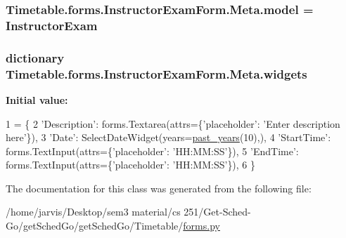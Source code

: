 \subsubsection[{\texorpdfstring{model}{model}}]{\setlength{\rightskip}{0pt plus 5cm}Timetable.\+forms.\+Instructor\+Exam\+Form.\+Meta.\+model = {\bf Instructor\+Exam}\hspace{0.3cm}{\ttfamily [static]}}\hypertarget{classTimetable_1_1forms_1_1InstructorExamForm_1_1Meta_a34a1ffa63c45106f0bd42087cdd17b5c}{}\label{classTimetable_1_1forms_1_1InstructorExamForm_1_1Meta_a34a1ffa63c45106f0bd42087cdd17b5c}
\subsubsection[{\texorpdfstring{widgets}{widgets}}]{\setlength{\rightskip}{0pt plus 5cm}dictionary Timetable.\+forms.\+Instructor\+Exam\+Form.\+Meta.\+widgets\hspace{0.3cm}{\ttfamily [static]}}\hypertarget{classTimetable_1_1forms_1_1InstructorExamForm_1_1Meta_a465e32885f71d0c5718e8d2d9836af9b}{}\label{classTimetable_1_1forms_1_1InstructorExamForm_1_1Meta_a465e32885f71d0c5718e8d2d9836af9b}
{\bfseries Initial value\+:}
\begin{DoxyCode}
1 = \{
2             \textcolor{stringliteral}{'Description'}: forms.Textarea(attrs=\{\textcolor{stringliteral}{'placeholder'}: \textcolor{stringliteral}{'Enter description here'}\}),
3             \textcolor{stringliteral}{'Date'}: SelectDateWidget(years=\hyperlink{namespaceTimetable_1_1forms_a4af0bb23874a094ad7dd2dc09f924c42}{past\_years}(10),),
4             \textcolor{stringliteral}{'StartTime'}: forms.TextInput(attrs=\{\textcolor{stringliteral}{'placeholder'}: \textcolor{stringliteral}{'HH:MM:SS'}\}),
5             \textcolor{stringliteral}{'EndTime'}: forms.TextInput(attrs=\{\textcolor{stringliteral}{'placeholder'}: \textcolor{stringliteral}{'HH:MM:SS'}\}),
6         \}
\end{DoxyCode}


The documentation for this class was generated from the following file\+:\begin{DoxyCompactItemize}
\item 
/home/jarvis/\+Desktop/sem3 material/cs 251/\+Get-\/\+Sched-\/\+Go/get\+Sched\+Go/get\+Sched\+Go/\+Timetable/\hyperlink{Timetable_2forms_8py}{forms.\+py}\end{DoxyCompactItemize}
